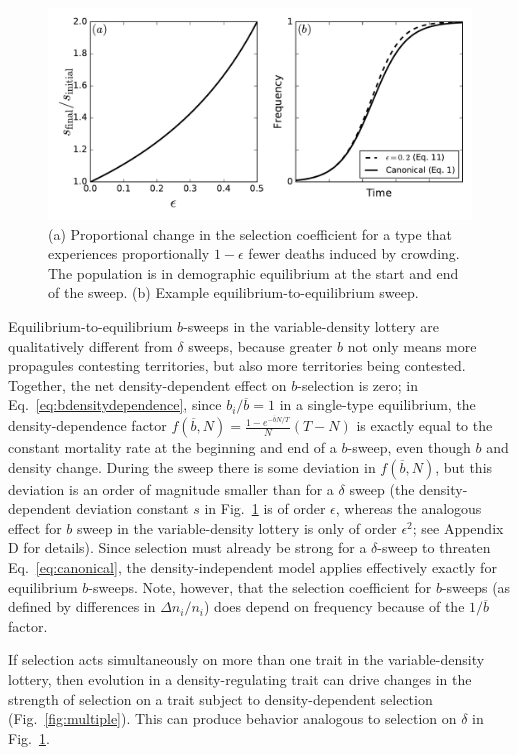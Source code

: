 \documentclass[12pt]{article}
\begin{document}
\begin{figure}
\centering
\includegraphics[scale=0.8]{strengthofselection.pdf}
\caption{\label{fig:strengthofselection} (a) Proportional change in the selection coefficient for a type that experiences proportionally $1-\epsilon$ fewer deaths induced by crowding. The population is in demographic equilibrium at the start and end of the sweep. (b) Example equilibrium-to-equilibrium sweep.}
\end{figure}

Equilibrium-to-equilibrium $b$-sweeps in the variable-density lottery are qualitatively different from $\delta$ sweeps, because greater $b$ not only means more propagules contesting territories, but also more territories being contested. Together, the net density-dependent effect on $b$-selection is zero; in Eq.~\eqref{eq:bdensitydependence}, since $b_i/\overline{b}=1$ in a single-type equilibrium, the density-dependence factor $f(\overline{b},N)=\frac{1-e^{-\overline{b}N/T}}{N}(T-N)$ is exactly equal to the constant mortality rate at the beginning and end of a $b$-sweep, even though $b$ and density change. During the sweep there is some deviation in $f(\overline{b},N)$, but this deviation is an order of magnitude smaller than for a $\delta$ sweep (the density-dependent deviation constant $s$ in Fig.~\ref{fig:strengthofselection} is of order $\epsilon$, whereas the analogous effect for $b$ sweep in the variable-density lottery is only of order $\epsilon^2$; see Appendix D for details). Since selection must already be strong for a $\delta$-sweep to threaten Eq.~\eqref{eq:canonical}, the density-independent model applies effectively exactly for equilibrium $b$-sweeps. Note, however, that the selection coefficient for $b$-sweeps (as  defined by differences in $\Delta n_i/n_i$) does depend on frequency because of the $1/\overline{b}$ factor. 

If selection acts simultaneously on more than one trait in the variable-density lottery, then evolution in a density-regulating trait can drive changes in the strength of selection on a trait subject to density-dependent selection (Fig.~\ref{fig:multiple}). This can produce behavior analogous to selection on $\delta$ in Fig.~\ref{fig:strengthofselection}. 
\end{document}
